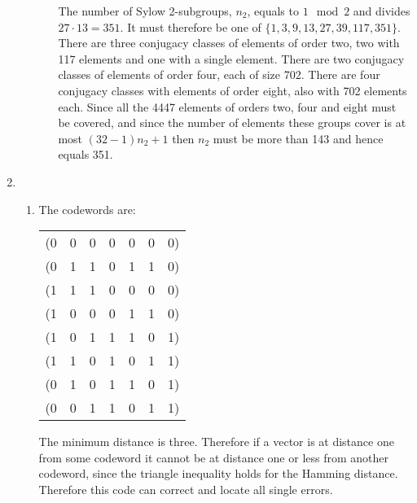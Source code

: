 \documentclass[11pt]{article} \usepackage{amssymb}
\begin{document}
\begin{enumerate}
\begin{enumerate}
\begin{itemize}
      The number of Sylow 2-subgroups, $n_2$, equals to $1\mod 2$ and divides
      $27\cdot 13=351$. It must therefore be one of 
      $\{1,3,9,13,27,39,117,351\}$. There are three conjugacy classes of elements of
      order two, two with 117 elements and one with a single element. There
      are two conjugacy classes of elements of order four, each of size 
      702. There are four conjugacy classes with elements of order eight,
      also with 702 elements each. Since all the 4447 elements of orders
      two, four and eight must be covered, and since the number of elements 
      these groups cover
      is at most $(32-1)n_2+1$ then $n_2$ must be more than 143 and hence 
      equals 351.
    \end{itemize}
    \end{enumerate}
  \item
    \begin{enumerate}
    \item The codewords are:

      \begin{tabular}{c c c c c c c}
        (0& 0& 0& 0& 0& 0& 0)\\
        (0& 1& 1& 0& 1& 1& 0)\\
        (1& 1& 1& 0& 0& 0& 0)\\
        (1& 0& 0& 0& 1& 1& 0)\\
        (1& 0& 1& 1& 1& 0& 1)\\
        (1& 1& 0& 1& 0& 1& 1)\\
        (0& 1& 0& 1& 1& 0& 1)\\
        (0& 0& 1& 1& 0& 1& 1)\\
      \end{tabular}

      The minimum distance is three. Therefore if a vector is at distance one
      from some codeword it cannot be at distance one or less from another
      codeword, since the triangle inequality holds for the Hamming distance.
      Therefore this code can correct and locate all single errors.
      

\end{enumerate}
\end{enumerate}
\end{document}
